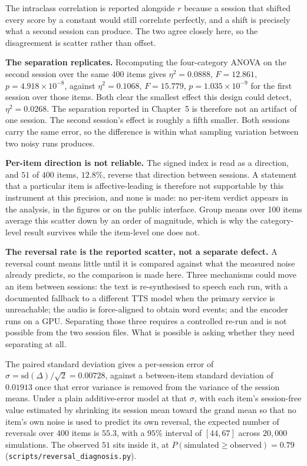 The intraclass correlation is reported alongside $r$ because a session that shifted every
score by a constant would still correlate perfectly, and a shift is precisely what a second
session can produce. The two agree closely here, so the disagreement is scatter rather than
offset.

\textbf{The separation replicates.} Recomputing the four-category ANOVA on the second session
over the same 400 items gives $\eta^2 = 0.0888$, $F = 12.861$, $p = 4.918\times10^{-8}$,
against $\eta^2 = 0.1068$, $F = 15.779$, $p = 1.035\times10^{-9}$ for the first session
over those items. Both clear the smallest effect this design could detect,
$\eta^2 = 0.0268$. The separation reported in Chapter~5 is therefore not an artifact of one
session. The second session's effect is roughly a fifth smaller. Both sessions carry the same
error, so the difference is within what sampling variation between two noisy runs produces.

\textbf{Per-item direction is not reliable.} The signed index is read as a direction, and
$51$ of $400$ items, $12.8\%$, reverse that direction between sessions. A statement that a
particular item is affective-leading is therefore not supportable by this instrument at this
precision, and none is made: no per-item verdict appears in the analysis, in the figures or
on the public interface. Group means over 100 items average this scatter down by an order of
magnitude, which is why the category-level result survives while the item-level one does not.

\textbf{The reversal rate is the reported scatter, not a separate defect.} A reversal count
means little until it is compared against what the measured noise already predicts, so the
comparison is made here. Three mechanisms could move an item between sessions: the text is
re-synthesised to speech each run, with a documented fallback to a different TTS model when
the primary service is unreachable; the audio is force-aligned to obtain word events; and the
encoder runs on a GPU. Separating those three requires a controlled re-run and is not possible
from the two session files. What is possible is asking whether they need separating at all.

The paired standard deviation gives a per-session error of
$\sigma = \mathrm{sd}(\Delta)/\sqrt{2} = 0.00728$, against a between-item standard deviation of
$0.01913$ once that error variance is removed from the variance of the session means. Under a
plain additive-error model at that $\sigma$, with each item's session-free value estimated by
shrinking its session mean toward the grand mean so that no item's own noise is used to predict
its own reversal, the expected number of reversals over 400 items is $55.3$, with a $95\%$
interval of $[44, 67]$ across $20{,}000$ simulations. The observed $51$ sits inside it, at
$P(\text{simulated} \ge \text{observed}) = 0.79$
(\texttt{scripts/reversal\_diagnosis.py}).

